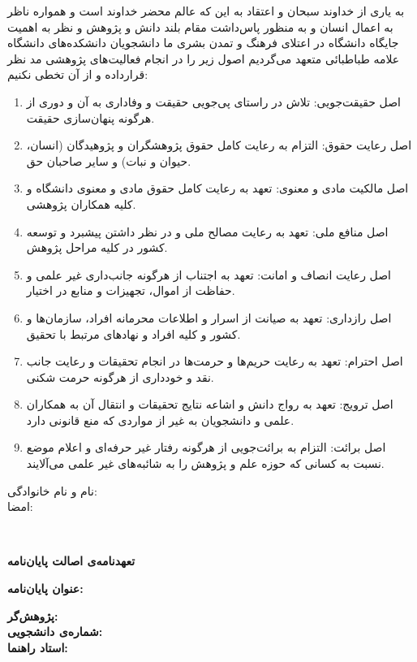 به یاری از خداوند سبحان و اعتقاد به این که عالم محضر خداوند است و همواره ناظر به اعمال انسان و به منظور پاس‌داشت مقام بلند دانش و پژوهش و نظر به اهمیت جایگاه دانشگاه در اعتلای فرهنگ و تمدن بشری ما دانشجویان دانشکده‌های دانشگاه علامه طباطبائی متعهد می‌گردیم اصول زیر را در انجام فعالیت‌های پژوهشی مد نظر قرارداده و از آن تخطی نکنیم:
\begin{enumerate}
\item
اصل حقیقت‌جویی: تلاش در راستای پی‌جویی حقیقت و وفاداری به آن و دوری از هرگونه پنهان‌سازی حقیقت.
\item
اصل رعایت حقوق: التزام به رعایت کامل حقوق پژوهشگران و پژوهیدگان (انسان، حیوان و نبات) و سایر صاحبان حق.
\item
اصل مالکیت مادی و معنوی: تعهد به رعایت کامل حقوق مادی و معنوی دانشگاه و کلیه همکاران پژوهشی.
\item
اصل منافع ملی: تعهد به رعایت مصالح ملی و در نظر داشتن پیشبرد و توسعه کشور در کلیه مراحل پژوهش.
\item
اصل رعایت انصاف و امانت: تعهد به اجتناب از هرگونه جانب‌داری غیر علمی و حفاظت از اموال، تجهیزات و منابع در اختیار.
\item
اصل رازداری: تعهد به صیانت از اسرار و اطلاعات محرمانه افراد، سازمان‌ها و کشور و کلیه افراد و نهادهای مرتبط با تحقیق.
\item
اصل احترام: تعهد به رعایت حریم‌ها و حرمت‌ها در انجام تحقیقات و رعایت جانب نقد و خودداری از هرگونه حرمت شکنی.
\item
اصل ترویج: تعهد به رواج دانش و اشاعه نتایج تحقیقات و انتقال آن به همکاران علمی و دانشجویان به غیر از مواردی که منع قانونی دارد.
\item
اصل برائت: التزام به برائت‌جویی از هرگونه رفتار غیر حرفه‌ای و اعلام موضع نسبت به کسانی که حوزه علم و پژوهش را به شائبه‌های غیر علمی می‌آلایند.

\end{enumerate}

\vspace{1cm}
\begin{center}
{ نام و نام خانوادگی:} \faAuthor \\ 
 \hspace{-1cm} امضا:\\
     \fadate
\end{center}
  \mbox{ }
%
\newpage
 \thispagestyle{empty}
\setlength{\baselineskip}{1.1\baselineskip}
\begin{center}
\textbf{
تعهدنامه‌ی اصالت پایان‌نامه}   

 \vspace{.8cm}

\textbf{ عنوان پایان‌نامه:}  \fatitle  \\  
\end{center}
\vspace{.5cm}
\textbf{ پژوهش‌گر:} \faAuthor \\  
 \textbf{شماره‌ی دانشجویی:} \stuno \\
\textbf{ استاد راهنما:} \fasupervisor  \vspace{.5cm}    \\  


